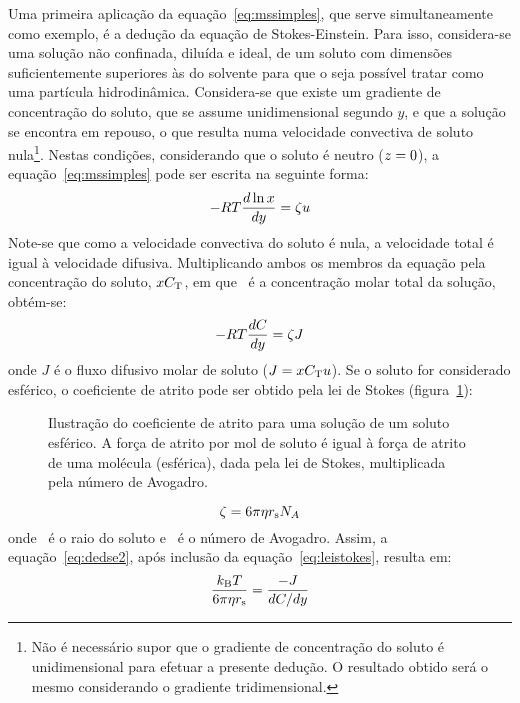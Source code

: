 Uma primeira aplicação da equação~\ref{eq:mssimples}, que serve simultaneamente como exemplo, é a dedução da equação de Stokes-Einstein. Para isso, considera-se uma solução não confinada, diluída e ideal, de um soluto com dimensões suficientemente superiores às do solvente para que o seja possível tratar como uma partícula hidrodinâmica. Considera-se que existe um gradiente de concentração do soluto, que se assume unidimensional segundo $y$, e que a solução se encontra em repouso, o que resulta numa velocidade convectiva de soluto nula\footnote{Não é necessário supor que o gradiente de concentração do soluto é unidimensional para efetuar a presente dedução. O resultado obtido será o mesmo considerando o gradiente tridimensional.}. Nestas condições, considerando que o soluto é neutro ($z=0$), a equação~\ref{eq:mssimples} pode ser escrita na seguinte forma:
\begin{equation}
 	\label{eq:dedse1}
 	-R T\frac{d\ln x}{dy}=\zeta u
 \end{equation} 
Note-se que como a velocidade convectiva do soluto é nula, a velocidade total é igual à velocidade difusiva. Multiplicando ambos os membros da equação pela concentração do soluto, $xC_{\mathrm{T}}$, em que \conctotal\ é a concentração molar total da solução, obtém-se:
\begin{equation}
	\label{eq:dedse2}
	-R T\frac{dC}{dy}=\zeta J
\end{equation}
onde $J$ é o fluxo difusivo molar de soluto ($J=xC_{\mathrm{T}} u$). Se o soluto for considerado esférico, o coeficiente de atrito pode ser obtido pela lei de Stokes (figura~\ref{fig:MSstokes}):
\begin{figure}
\centering

\caption[Coeficiente de atrito para uma solução de um soluto esférico]{Ilustração do coeficiente de atrito para uma solução de um soluto esférico. A força de atrito por mol de soluto é igual à força de atrito de uma molécula (esférica), dada pela lei de Stokes, multiplicada pela número de Avogadro.}
\label{fig:MSstokes}
\end{figure}
\begin{equation}
	\label{eq:leistokes}
	\zeta=6\pi\eta r_{\mathrm{s}}N_{A}
\end{equation}
onde \raiostokes\ é o raio do soluto e \avogadro\ é o número de Avogadro. Assim, a equação~\ref{eq:dedse2}, após inclusão da equação~\ref{eq:leistokes}, resulta em:
\begin{equation}
	\label{eq:dedse3}
	\frac{k_{\mathrm{B}} T}{6\pi\eta r_{\mathrm{s}}}=\frac{-J}{dC/dy}
\end{equation}
